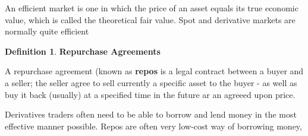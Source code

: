 \documentclass{book}
\theoremstyle{definition}
\newtheorem{definition}{Definition}[section]
\theoremstyle{remark}
\begin{document}
        \begin{tcolorbox}[colback=blue!5!white,colframe=blue!75!black, title=Sticky Note]
            An efficient market is one in which the price of an asset equals its true economic value, which is called the theoretical fair value. Spot and derivative markets are normally quite efficient
        \end{tcolorbox}        
        
        \begin{definition}{\textbf{Repurchase Agreements}}
            
            A repurchase agreement (known as \textbf{repos} is a legal contract between a buyer and a seller; the seller agree to sell currently a specific asset to the buyer - as well as buy it back (usually) at a specified time in the future ar an agreeed upon price. 
            
            Derivatives traders often need to be able to borrow and lend money in the most effective manner possible. Repos are often very low-cost way of borrowing money, 
        \end{definition}
        
\end{document}
